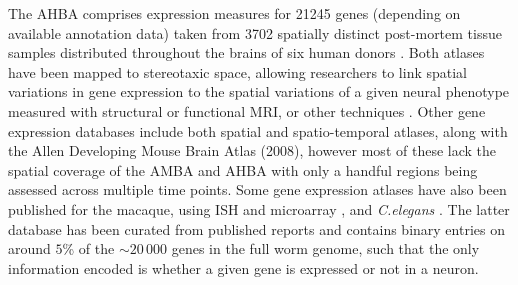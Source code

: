 The AHBA comprises expression measures for \num{21245} genes (depending on available annotation data) taken from 3702 spatially distinct post-mortem tissue samples distributed throughout the brains of six human donors \citep{Hawrylycz2012,Hawrylycz2015}.
Both atlases have been mapped to stereotaxic space, allowing researchers to link spatial variations in gene expression to the spatial variations of a given neural phenotype measured with structural or functional MRI, or other techniques \mbox{\citep{Furth2018}}.
Other gene expression databases include both spatial \citep{Fertuzinhos2014} and spatio-temporal \citep{Ayoub2011,Belgard2011,Colantuoni2011,Miller2014} atlases, along with the Allen Developing Mouse Brain Atlas (2008), however most of these lack the spatial coverage of the AMBA and AHBA with only a handful regions being assessed across multiple time points. Some gene expression atlases have also been published for the macaque, using ISH and microarray \citep{Bakken2016}, and \textit{C.elegans} \citep{Harris2010}.
The latter database has been curated from published reports and contains binary entries on around $5$\% of the $\sim20\,000$ genes in the full worm genome, such that the only information encoded is whether a given gene is expressed or not in a neuron.

